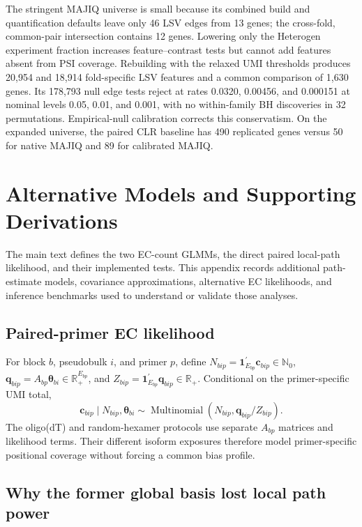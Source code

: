 \documentclass[11pt]{article}
\begin{document}
The stringent MAJIQ universe is small because its combined build and quantification defaults leave only 46 LSV edges from 13 genes; the cross-fold, common-pair intersection contains 12 genes. Lowering only the Heterogen experiment fraction increases feature--contrast tests but cannot add features absent from PSI coverage. Rebuilding with the relaxed UMI thresholds produces 20,954 and 18,914 fold-specific LSV features and a common comparison of 1,630 genes. Its 178,793 null edge tests reject at rates 0.0320, 0.00456, and 0.000151 at nominal levels 0.05, 0.01, and 0.001, with no within-family BH discoveries in 32 permutations. Empirical-null calibration corrects this conservatism. On the expanded universe, the paired CLR baseline has 490 replicated genes versus 50 for native MAJIQ and 89 for calibrated MAJIQ.

\section{Alternative Models and Supporting Derivations}

The main text defines the two EC-count GLMMs, the direct paired local-path likelihood, and their implemented tests. This appendix records additional path-estimate models, covariance approximations, alternative EC likelihoods, and inference benchmarks used to understand or validate those analyses.

\subsection*{Paired-primer EC likelihood}

For block \(b\), pseudobulk \(i\), and primer \(p\), define \(N_{bip}=\bm1_{E_{bp}}^\prime\bm c_{bip}\in\mathbb N_0\), \(\bm q_{bip}=A_{bp}\bm\theta_{bi}\in\mathbb R_+^{E_{bp}}\), and \(Z_{bip}=\bm1_{E_{bp}}^\prime\bm q_{bip}\in\mathbb R_+\). Conditional on the primer-specific UMI total, \[
 \bm c_{bip}\mid N_{bip},\bm\theta_{bi}
 \sim\operatorname{Multinomial}
 \left(N_{bip},\bm q_{bip}/Z_{bip}\right).
\]
The oligo(dT) and random-hexamer protocols use separate \(A_{bp}\) matrices and likelihood terms. Their different isoform exposures therefore model primer-specific positional coverage without forcing a common bias profile.

\subsection*{Why the former global basis lost local path power}
\end{document}
